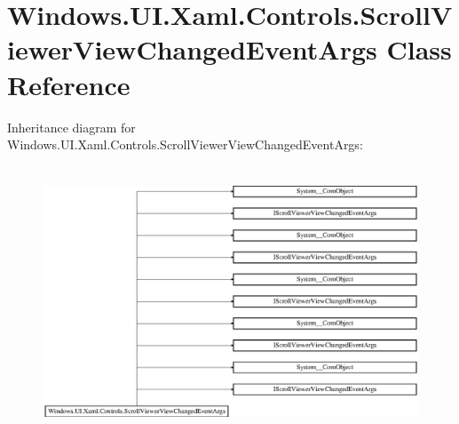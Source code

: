 \hypertarget{class_windows_1_1_u_i_1_1_xaml_1_1_controls_1_1_scroll_viewer_view_changed_event_args}{}\section{Windows.\+U\+I.\+Xaml.\+Controls.\+Scroll\+Viewer\+View\+Changed\+Event\+Args Class Reference}
\label{class_windows_1_1_u_i_1_1_xaml_1_1_controls_1_1_scroll_viewer_view_changed_event_args}
Inheritance diagram for Windows.\+U\+I.\+Xaml.\+Controls.\+Scroll\+Viewer\+View\+Changed\+Event\+Args\+:\begin{figure}[H]
\begin{center}
\leavevmode
\includegraphics[height=8.041776cm]{class_windows_1_1_u_i_1_1_xaml_1_1_controls_1_1_scroll_viewer_view_changed_event_args}
\end{center}
\end{figure}
